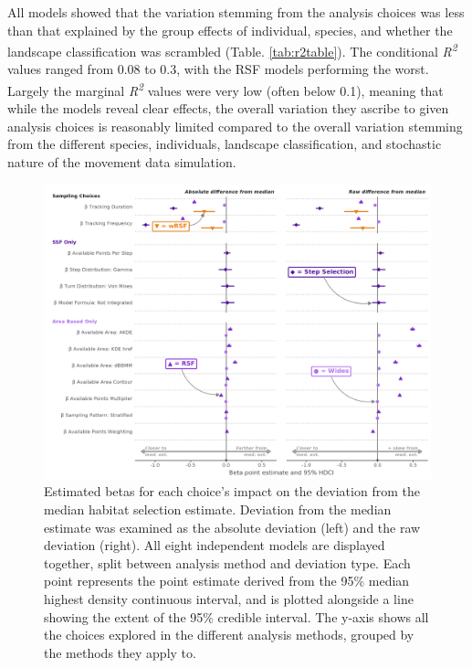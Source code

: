 \documentclass[10pt,a4paper]{article}
\begin{document}
All models showed that the variation stemming from the analysis choices was less than that explained by the group effects of individual, species, and whether the landscape classification was scrambled (Table. \ref{tab:r2table}).
The conditional \emph{R\textsuperscript{2}} values ranged from 0.08 to 0.3, with the RSF models performing the worst.
Largely the marginal \emph{R\textsuperscript{2}} values were very low (often below 0.1), meaning that while the models reveal clear effects, the overall variation they ascribe to given analysis choices is reasonably limited compared to the overall variation stemming from the different species, individuals, landscape classification, and stochastic nature of the movement data simulation.

\begin{figure}
\includegraphics[width=1\linewidth]{../figures/_allEffectsPlot} \caption{Estimated betas for each choice's impact on the deviation from the median habitat selection estimate. Deviation from the median estimate was examined as the absolute deviation (left) and the raw deviation (right). All eight independent models are displayed together, split between analysis method and deviation type. Each point represents the point estimate derived from the 95\% median highest density continuous interval, and is plotted alongside a line showing the extent of the 95\% credible interval. The y-axis shows all the choices explored in the different analysis methods, grouped by the methods they apply to.}\label{fig:brmsAllEffectsPlot}
\end{figure}
\end{document}
